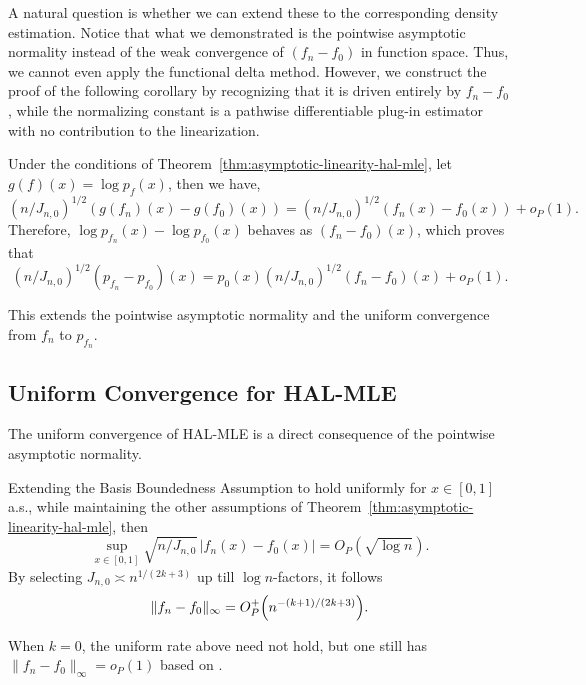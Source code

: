 A natural question is whether we can extend these to the corresponding density estimation. Notice that what we demonstrated is the pointwise asymptotic normality instead of the weak convergence of $(f_n-f_0)$ in function space. Thus, we cannot even apply the functional delta method. 
However, we construct the proof of the following corollary by recognizing that it is driven entirely by $f_n-f_0$, while the normalizing constant is a pathwise differentiable plug-in estimator with no contribution to the linearization.

\begin{corollary} \label{coro: Delta-method for Density Estimation}
    Under the conditions of Theorem~\ref{thm:asymptotic-linearity-hal-mle}, let $g(f)(x)=\log p_f(x)$, then we have,
    \[
    (n/J_{n,0})^{1/2}( g(f_n)(x)-g(f_0)(x))=(n/J_{n,0})^{1/2}(f_n(x)-f_0(x))+o_P(1).
    \]
    Therefore, $\log p_{f_n}(x)-\log p_{f_0}(x)$ behaves as $(f_n-f_0)(x)$, which proves that 
    \[
    (n/J_{n,0})^{1/2}(p_{f_n}-p_{f_0})(x)=p_0(x)(n/J_{n,0})^{1/2}(f_n-f_0)(x)+o_P(1).
    \]
\end{corollary}
This extends the pointwise asymptotic normality and the uniform convergence from $f_n$ to $p_{f_n}$. 

\subsection{Uniform Convergence for HAL-MLE} \label{subsct: uniform convergence for HAL-MLE}
The uniform convergence of HAL-MLE is a direct consequence of the pointwise asymptotic normality.
\begin{theorem}\label{thm:uniform-density-hal}
Extending the Basis Boundedness Assumption to hold uniformly for $x \in [0,1]$ a.s., while maintaining the other assumptions of Theorem~\ref{thm:asymptotic-linearity-hal-mle}, then
\[
\sup_{x\in[0,1]}
\sqrt{n/J_{n,0}}\,\lvert f_n(x)-f_0(x)\rvert
= O_P(\sqrt{\log n}).\]
By selecting $J_{n,0}\asymp n^{1/(2k+3)}$  up till $\log n$-factors, it follows
\quad
\[
\|f_n - f_0\|_\infty
= O_P^+\Bigl(n^{-(k+1)/(2k+3)}\Bigr).
\]
\end{theorem}

\begin{remark}
When \(k=0\), the uniform rate above need not hold, but one still has
\(\|f_n - f_0\|_\infty = o_P(1)\) based on \citet{van2017uniform}.
\end{remark}

